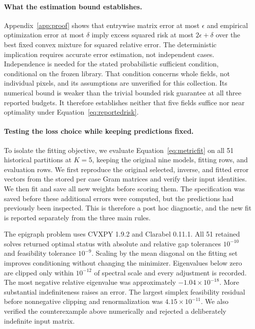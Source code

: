 \paragraph{What the estimation bound establishes.}
Appendix~\ref{app:proof} shows that entrywise matrix error at most $\epsilon$
and empirical optimization error at most $\delta$ imply excess squared risk
at most $2\epsilon+\delta$ over the best fixed convex mixture for squared
relative error. The deterministic implication requires accurate error
estimation, not independent cases. Independence is needed for the stated
probabilistic sufficient condition, conditional on the frozen library.
That condition concerns whole fields, not individual pixels, and its
assumptions are unverified for this collection. Its numerical bound is weaker
than the trivial bounded risk guarantee at all three reported budgets.
It therefore establishes neither that five fields suffice nor near optimality
under Equation~\eqref{eq:reportedrisk}.

\paragraph{Testing the loss choice while keeping predictions fixed.}
To isolate the fitting objective, we evaluate Equation~\eqref{eq:metricfit} on
all 51 historical partitions at $K=5$, keeping the original nine models,
fitting rows, and evaluation rows. We first reproduce the original selected,
inverse, and fitted error vectors from the stored per case Gram matrices and
verify their input identities. We then fit and save all new weights before
scoring them. The specification was saved before these additional errors were
computed, but the predictions had previously been inspected. This is therefore
a post hoc diagnostic, and the new fit is reported separately from the three main rules.

The epigraph problem uses CVXPY 1.9.2 and Clarabel 0.11.1. All 51 retained solves returned
optimal status with absolute and relative gap tolerances $10^{-10}$ and
feasibility tolerance $10^{-9}$. Scaling by the mean diagonal on the fitting set improves
conditioning without changing the minimizer. Eigenvalues below zero are
clipped only within $10^{-12}$ of spectral scale and every adjustment is
recorded. The most negative relative eigenvalue was approximately
$-1.04\times10^{-18}$. More substantial indefiniteness raises an error.
The largest simplex feasibility residual before nonnegative clipping and
renormalization was $4.15\times10^{-11}$. We also verified the counterexample
above numerically and rejected a deliberately indefinite input matrix.

